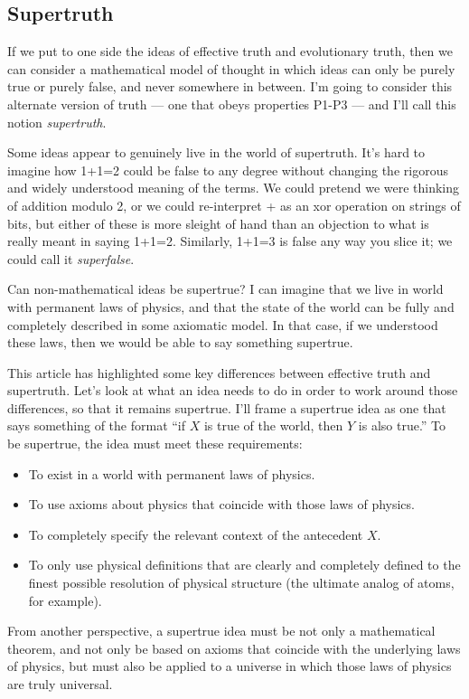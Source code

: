 \documentclass[11pt, oneside]{article}   	%
\begin{document}
\subsection{Supertruth}\label{supertruth}

If we put to one side the ideas of effective truth and evolutionary truth, then
we can consider a mathematical model of thought in which ideas can only be
purely true or purely false, and never somewhere in between.
I'm going to consider this alternate version
of truth --- one that obeys properties P1-P3 --- and I'll call this notion
{\em supertruth}.

Some ideas appear to genuinely live in the world of supertruth. It's hard to
imagine how 1+1=2 could be false to any degree without changing the rigorous and
widely understood meaning of the terms. We could pretend we were thinking of
addition modulo 2, or we could re-interpret + as an xor operation on strings of
bits, but either of these is more sleight of hand than an objection to what is
really meant in saying 1+1=2. Similarly, 1+1=3 is false any way you slice it; we
could call it {\em superfalse}.

Can non-mathematical ideas be supertrue?
I can imagine that we live in world with permanent laws of physics, and that the
state of the world can be fully and completely described in some axiomatic
model. In that case, if we understood these laws, then we would be able to say
something supertrue.

This article has highlighted some key differences between
effective truth and supertruth.
Let's look at what an idea needs to do in order to work around those
differences, so that it remains supertrue.
I'll frame a supertrue idea as one that says something of the format ``if $X$ is
true of the world, then $Y$ is also true.''
To be supertrue, the idea must meet these requirements:
\begin{itemize}
    \item To exist in a world with permanent laws of physics.
    \item To use axioms about physics that coincide with those laws of physics.
    \item To completely specify the relevant context of the antecedent $X$.
    \item To only use physical definitions that are clearly and completely
        defined to the finest possible resolution of physical structure (the
        ultimate analog of atoms, for example).
\end{itemize}
From another perspective, a supertrue idea must be not only a mathematical
theorem, and not only be based on axioms that coincide with the underlying laws
of physics, but must also be applied to a universe in which those laws of
physics are truly universal.
\end{document}
